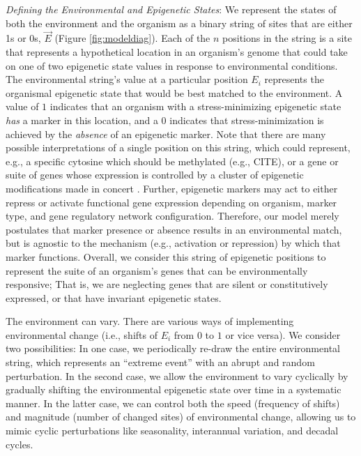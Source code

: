 \documentclass{article}
\begin{document}
\noindent \textit{Defining the Environmental and  Epigenetic States}: We represent the states of both the environment and the organism as a binary string of sites that are either 1s or 0s, $\vec{E}$ (Figure \ref{fig:modeldiag}). Each of the $n$ positions in the string is a site that represents a hypothetical location in an organism's genome that could take on one of two epigenetic state values in response to environmental conditions. The environmental string's value at a particular position $E_i$ represents the organismal epigenetic state that would be best matched to the environment. %
A value of $1$ indicates that an organism with a stress-minimizing epigenetic state \textit{has} a marker in this location, and a $0$ indicates that stress-minimization is achieved by the \textit{absence} of an epigenetic marker. Note that there are many possible interpretations of a single position on this string, which could represent, e.g., a specific cytosine which should be methylated (e.g., CITE), or a gene or suite of genes whose expression is controlled by a cluster of epigenetic modifications made in concert \citep[e.g.,][]{adrian2020understanding}. Further, epigenetic markers may act to either repress or activate functional gene expression depending on organism, marker type, and gene regulatory network configuration. Therefore, our model merely postulates that marker presence or absence results in an environmental match, but is agnostic to the mechanism (e.g., activation or repression) by which that marker functions. Overall, we consider this string of epigenetic positions to represent the suite of an organism's genes that can be environmentally responsive; That is, we are neglecting genes that are silent or constitutively expressed, or that have invariant epigenetic states.

The environment can vary. There are various ways of implementing environmental change (i.e., shifts of $E_i$ from $0$ to $1$ or vice versa). We consider two possibilities: In one case, we periodically re-draw the entire environmental string, which represents an ``extreme event'' with an abrupt and random perturbation. In the second case, we allow the environment to vary cyclically by gradually shifting the environmental epigenetic state over time in a systematic manner. In the latter case, we can control both the speed (frequency of shifts) and magnitude (number of changed sites) of environmental change, allowing us to mimic cyclic perturbations like seasonality, interannual variation, and decadal cycles.
\end{document}
